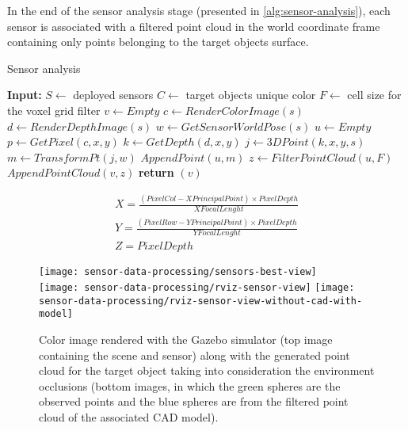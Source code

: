 In the end of the sensor analysis stage (presented in \cref{alg:sensor-analysis}), each sensor is associated with a filtered point cloud in the world coordinate frame containing only points belonging to the target objects surface.

\begin{algorithm}
	\caption{Sensor analysis}
	\label{alg:sensor-analysis}
	\begin{algorithmic}[1]
		\State \textbf{Input:}
		\State $S \gets$ deployed sensors
		\State $C \gets$ target objects unique color
		\State $F \gets$ cell size for the voxel grid filter
			\State $v \gets Empty$
				\State $c \gets RenderColorImage(s)$
				\State $d \gets RenderDepthImage(s)$
				\State $w \gets GetSensorWorldPose(s)$
				\State $u \gets Empty$
						\State $p \gets GetPixel(c,x,y)$
							\State $k \gets GetDepth(d,x,y)$
								\State $j \gets 3DPoint(k,x,y,s)$
								\State $m \gets TransformPt(j,w)$
								\State $AppendPoint(u,m)$
							\EndIf
						\EndIf
					\EndFor
				\EndFor
				\State $z \gets FilterPointCloud(u,F)$
				\State $AppendPointCloud(v,z)$
			\EndFor
			\State \textbf{return} $(v)$
		\EndProcedure
	\end{algorithmic}
\end{algorithm}

\footnotesize
\begin{equation}\label{eq:pointcloud}
	\begin{split}
		X = \frac{(PixelCol - XPrincipalPoint) \times PixelDepth}{XFocalLenght}\\
		Y = \frac{(PixelRow - YPrincipalPoint) \times PixelDepth}{YFocalLenght}\\
		Z = PixelDepth
	\end{split}
\end{equation}
\normalsize

\begin{figure}
	\centering
	\texttt{[image: sensor-data-processing/sensors-best-view]}\\
	\vspace{0.5em}
	\texttt{[image: sensor-data-processing/rviz-sensor-view]}\hspace{2em}
	\texttt{[image: sensor-data-processing/rviz-sensor-view-without-cad-with-model]}
	\caption{Color image rendered with the Gazebo simulator (top image containing the scene and sensor) along with the generated point cloud for the target object taking into consideration the environment occlusions (bottom images, in which the green spheres are the observed points and the blue spheres are from the filtered point cloud of the associated CAD model).}
\end{figure}


